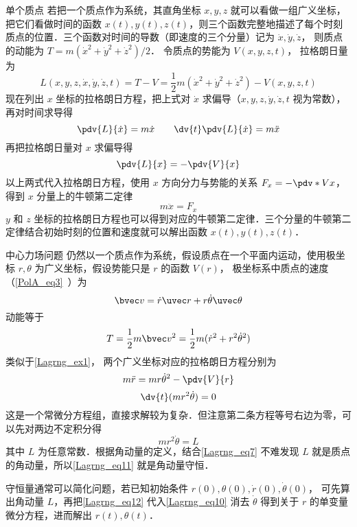 \begin{example}{单个质点}\label{Lagrng_ex1}
若把一个质点作为系统，其直角坐标 $x,y,z$ 就可以看做一组广义坐标，把它们看做时间的函数 $x(t), y(t), z(t)$，则三个函数完整地描述了每个时刻质点的位置．三个函数对时间的导数（即速度的三个分量）记为 $\dot x, \dot y, \dot z$， 则质点的动能为 $T=m(\dot x^2+\dot y^2+\dot z^2)/2$． 令质点的势能为 $V(x,y,z,t)$， 拉格朗日量为
\begin{equation}
L(x,y,z, \dot x, \dot y, \dot z, t) = T-V = \frac12 m(\dot x^2+\dot y^2+\dot z^2) - V(x,y,z,t)
\end{equation}
现在列出 $x$ 坐标的拉格朗日方程，把上式对 $\dot x$ 求偏导（$x, y,z, \dot y, \dot z, t$ 视为常数），再对时间求导得
\begin{equation}
\pdv{L}{\dot x} = m\dot x
\qquad
\dv{t} \pdv{L}{\dot x} = m\ddot x
\end{equation}
再把拉格朗日量对 $x$ 求偏导得
\begin{equation}
\pdv{L}{x} = -\pdv{V}{x}
\end{equation}
以上两式代入拉格朗日方程，使用 $x$ 方向分力与势能的关系 $F_x = -\pdv*{V}{x}$， 得到 $x$ 分量上的牛顿第二定律
\begin{equation}
m\ddot x = F_x
\end{equation}
$y$ 和 $z$ 坐标的拉格朗日方程也可以得到对应的牛顿第二定律．三个分量的牛顿第二定律结合初始时刻的位置和速度就可以解出函数 $x(t), y(t), z(t)$． 
\end{example}

\begin{example}{中心力场问题}
仍然以一个质点作为系统，假设质点在一个平面内运动，使用极坐标 $r, \theta$ 为广义坐标，假设势能只是 $r$ 的函数 $V(r)$， 极坐标系中质点的速度（\autoref{PolA_eq3}~）为
\begin{equation}\label{Lagrng_eq7}
\bvec v = \dot r\uvec r + r\dot \theta \uvec \theta
\end{equation}
动能等于
\begin{equation}
T = \frac12 m\bvec v^2 = \frac12 m(\dot r^2 + r^2 \dot \theta^2)
\end{equation}
类似于\autoref{Lagrng_ex1}， 两个广义坐标对应的拉格朗日方程分别为
\begin{equation}\label{Lagrng_eq10}
m\ddot r = mr \dot \theta^2 - \pdv{V}{r}
\end{equation}
\begin{equation}\label{Lagrng_eq11}
\dv{t} (m r^2\dot \theta)  = 0
\end{equation}
这是一个常微分方程组，直接求解较为复杂．但注意第二条方程等号右边为零，可以先对两边不定积分得
\begin{equation}\label{Lagrng_eq12}
mr^2\dot\theta = L
\end{equation}
其中 $L$ 为任意常数．根据角动量的定义，结合\autoref{Lagrng_eq7} 不难发现 $L$ 就是质点的角动量，所以\autoref{Lagrng_eq11} 就是角动量守恒．

守恒量通常可以简化问题，若已知初始条件 $r(0), \theta (0), \dot r(0), \dot\theta (0)$， 可先算出角动量 $L$，再把\autoref{Lagrng_eq12} 代入\autoref{Lagrng_eq10} 消去 $\dot\theta$ 得到关于 $r$ 的单变量微分方程，进而解出 $r(t), \theta (t)$．
\end{example}

